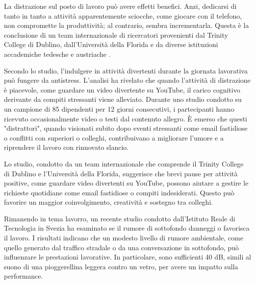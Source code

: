 \documentclass[12pt]{book} %
\begin{document}
\begin{mdframed}[linewidth=1pt]
La distrazione sul posto di lavoro può avere effetti benefici. Anzi, dedicarsi di tanto in tanto a attività apparentemente sciocche, come giocare con il telefono, non compromette la produttività; al contrario, sembra incrementarla. Questa è la conclusione di un team internazionale di ricercatori provenienti dal Trinity College di Dublino, dall'Università della Florida e da diverse istituzioni accademiche tedesche e austriache .

Secondo lo studio, l'indulgere in attività divertenti durante la giornata lavorativa può fungere da antistress. L'analisi ha rivelato che quando l'attività di distrazione è piacevole, come guardare un video divertente su YouTube, il carico cognitivo derivante da compiti stressanti viene alleviato. Durante uno studio condotto su un campione di 85 dipendenti per 12 giorni consecutivi, i partecipanti hanno ricevuto occasionalmente video o testi dal contenuto allegro. È emerso che questi "distrattori", quando visionati subito dopo eventi stressanti come email fastidiose o conflitti con superiori o colleghi, contribuivano a migliorare l'umore e a riprendere il lavoro con rinnovato slancio.

Lo studio, condotto da un team internazionale che comprende il Trinity College di Dublino e l'Università della Florida, suggerisce che brevi pause per attività positive, come guardare video divertenti su YouTube, possono aiutare a gestire le richieste quotidiane come email fastidiose o compiti indesiderati. Questo può favorire un maggior coinvolgimento, creatività e sostegno tra colleghi.

Rimanendo in tema lavorro, un recente studio condotto dall'Istituto Reale di Tecnologia in Svezia ha esaminato se il rumore di sottofondo danneggi o favorisca il lavoro. I risultati indicano che un modesto livello di rumore ambientale, come quello generato dal traffico stradale o da una conversazione in sottofondo, può influenzare le prestazioni lavorative. In particolare, sono sufficienti 40 dB, simili al suono di una pioggerellina leggera contro un vetro, per avere un impatto sulla performance.


\end{mdframed}
\end{document}

